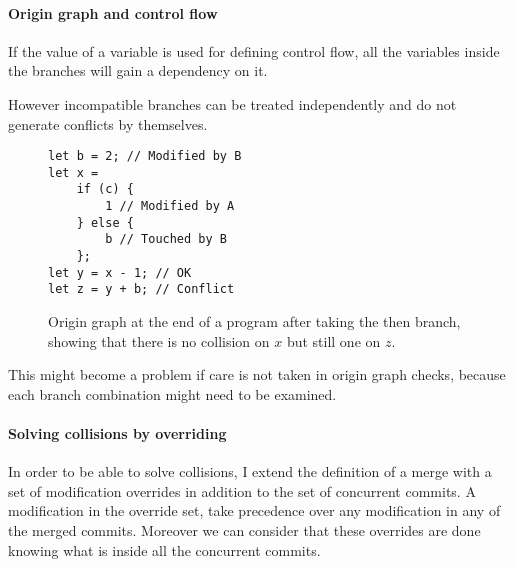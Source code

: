 \documentclass[a4paper,10pt]{article}
\begin{document}
\paragraph{Origin graph and control flow} If the value of a variable is used for defining control flow, all the variables inside the branches will gain a dependency on it.

However incompatible branches can be treated independently and do not generate conflicts by themselves.

\begin{figure}[ht]
\begin{minipage}{.5\textwidth}
\begin{lstlisting}
let b = 2; // Modified by B
let x =
    if (c) {
        1 // Modified by A
    } else {
        b // Touched by B
    };
let y = x - 1; // OK
let z = y + b; // Conflict
\end{lstlisting}
\end{minipage}\hfill
\begin{minipage}{.45\textwidth}
\centering{}
\end{minipage}
\caption{Origin graph at the end of a program after taking the then branch, showing that there is no collision on $x$ but still one on $z$.}
\label{fig:origin_graph_branches}
\end{figure}

This might become a problem if care is not taken in origin graph checks, because each branch combination might need to be examined.

\paragraph{Solving collisions by overriding}
In order to be able to solve collisions, I extend the definition of a merge with a set of modification overrides in addition to the set of concurrent commits.
A modification in the override set, take precedence over any modification in any of the merged commits. Moreover we can consider that these overrides are done knowing what is inside all the concurrent commits.
\end{document}
